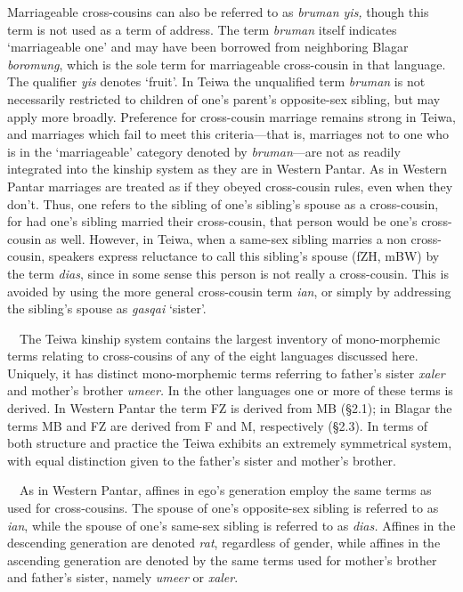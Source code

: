 Marriageable cross-cousins can also be referred to as \textit{bruman yis, }though this term is not used as a term of address. The term \textit{bruman }itself indicates {\textquoteleft}marriageable one{\textquoteright} and may have been borrowed from neighboring Blagar \textit{boromung}, which is the sole term for marriageable cross-cousin in that language. The qualifier \textit{yis }denotes {\textquoteleft}fruit{\textquoteright}. In Teiwa the unqualified term \textit{bruman }is not necessarily restricted to children of one{\textquoteright}s parent{\textquoteright}s opposite-sex sibling, but may apply more broadly. Preference for cross-cousin marriage remains strong in Teiwa, and marriages which fail to meet this criteria---that is, marriages not to one who is in the {\textquoteleft}marriageable{\textquoteright} category denoted by \textit{bruman}{}---are not as readily integrated into the kinship system as they are in Western Pantar. As in Western Pantar marriages are treated as if they obeyed cross-cousin 
rules, even when they don{\textquoteright}t. Thus, one refers to the sibling of one{\textquoteright}s sibling{\textquoteright}s spouse as a cross-cousin, for had one{\textquoteright}s sibling married their cross-cousin, that person would be one{\textquoteright}s cross-cousin as well. However, in Teiwa, when a same-sex sibling marries a non cross-cousin, speakers express reluctance to call this sibling{\textquoteright}s spouse (fZH, mBW) by the term \textit{dias}, since in some sense this person is not really a cross-cousin. This is avoided by using the more general cross-cousin term \textit{ian}, or simply by addressing the sibling{\textquoteright}s spouse as \textit{gasqai }{\textquoteleft}sister{\textquoteright}. 

\ \ The Teiwa kinship system contains the largest inventory of mono-morphemic terms relating to cross-cousins of any of the eight languages discussed here. Uniquely, it has distinct mono-morphemic terms referring to father{\textquoteright}s sister \textit{xaler }and mother{\textquoteright}s brother \textit{umeer. }In the other languages one or more of these terms is derived. In Western Pantar the term FZ is derived from MB ({\S}2.1); in Blagar the terms MB and FZ are derived from F and M, respectively ({\S}2.3). In terms of both structure and practice the Teiwa exhibits an extremely symmetrical system, with equal distinction given to the father{\textquoteright}s sister and mother{\textquoteright}s brother. 

\ \ As in Western Pantar, affines in ego{\textquoteright}s generation employ the same terms as used for cross-cousins. The spouse of one{\textquoteright}s opposite-sex sibling is referred to as \textit{ian}, while the spouse of one{\textquoteright}s same-sex sibling is referred to as \textit{dias. }Affines in the descending generation are denoted \textit{rat}, regardless of gender, while affines in the ascending generation are denoted by the same terms used for mother{\textquoteright}s brother and father{\textquoteright}s sister, namely \textit{umeer} or \textit{xaler}. 

